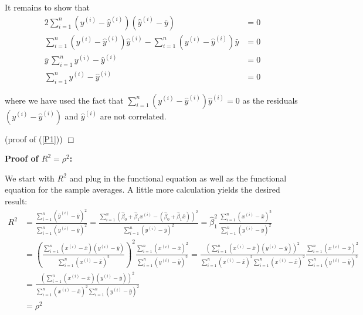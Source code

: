 {{{It remains to show that 
\begin{align*}
	2\sum_{i=1}^n(y^{(i)}-\hat{y}^{(i)})(\hat{y}^{(i)} - \bar{y}) &= 0 \\
	\sum_{i=1}^n (y^{(i)}-\hat{y}^{(i)})\hat{y}^{(i)} - \sum_{i=1}^n (y^{(i)}-\hat{y}^{(i)})\bar{y}&= 0 \\
	\bar{y}\, \sum_{i=1}^n y^{(i)}-\hat{y}^{(i)} &= 0 \\
	\sum_{i=1}^n y^{(i)}-\hat{y}^{(i)} &= 0
\end{align*}

where we have used the fact that $\sum_{i=1}^n (y^{(i)}-\hat{y}^{(i)})\hat{y}^{(i)} = 0$ as the residuals $(y^{(i)}-\hat{y}^{(i)})$ and $\hat{y}^{(i)}$ are not correlated. 

\hfill (proof of (\ref{P1})) $\Box$ \\
}}

\bigskip


\textbf{Proof of \(R^2 = \rho^2\):}

We start with $R^2$ and plug in the functional equation as well as the functional equation for the sample averages. A little more calculation yields the desired result:
\begin{align*}
	R^2
    &= \frac{\sum_{i=1}^n (\hat{y}^{(i)} - \bar{y})^2}{\sum_{i=1}^n (y^{(i)} - \bar{y})^2}
	= \frac{\sum_{i=1}^n(\hat{\beta}_0 + \hat{\beta}_1 x^{(i)}- (\hat{\beta}_0 + \hat{\beta}_1 \bar{x}))^2}{\sum_{i=1}^n (y^{(i)} - \bar{y})^2}
    = \hat{\beta}_1^2 \, \frac{\sum_{i=1}^n (x^{(i)} - \bar{x})^2}{\sum_{i=1}^n (y^{(i)} - \bar{y})^2}  \\
    &= \left(\frac{\sum_{i=1}^n (x^{(i)} - \bar{x})(y^{(i)} - \bar{y})}{\sum_{i=1}^n (x^{(i)} - \bar{x})^2}\right)^2 \frac{\sum_{i=1}^n (x^{(i)} - \bar{x})^2}{\sum_{i=1}^n (y^{(i)} - \bar{y})^2} 
    = \frac{ \left( \sum_{i=1}^n (x^{(i)} - \bar{x})(y^{(i)} - \bar{y}) \right)^2 }{\sum_{i=1}^n (x^{(i)} - \bar{x})^2 \sum_{i=1}^n (x^{(i)} - \bar{x})^2} \frac{\sum_{i=1}^n (x^{(i)} - \bar{x})^2}{\sum_{i=1}^n (y^{(i)} - \bar{y})^2} \\
    &= \frac{\left(\sum_{i=1}^n (x^{(i)} - \bar{x})(y^{(i)} - \bar{y})\right)^2}{\sum_{i=1}^n (x^{(i)} - \bar{x})^2\sum_{i=1}^n (y^{(i)} - \bar{y})^2} \\
    &= \rho^2
\end{align*}

}
